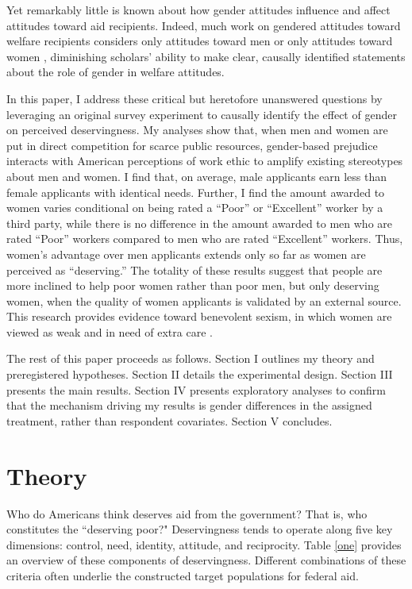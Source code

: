 \documentclass[12pt]{article}%
\begin{document}
\begin{doublespace}
Yet remarkably little is known about how gender attitudes influence and affect attitudes toward aid recipients. Indeed, much work on gendered attitudes toward welfare recipients considers only attitudes toward men \citep{petersen2012deserves, aaroe2014crowding, willrich2000home} or only attitudes toward women \citep{monnat2010color, desante_working_2013, hayes_2020}, diminishing scholars' ability to make clear, causally identified statements about the role of gender in welfare attitudes. 

In this paper, I address these critical but heretofore unanswered questions by leveraging an original survey experiment to causally identify the effect of gender on perceived deservingness. My analyses show that, when men and women are put in direct competition for scarce public resources, gender-based prejudice interacts with American perceptions of work ethic to amplify existing stereotypes about men and women. I find that, on average, male applicants earn less than female applicants with identical needs. Further, I find the amount awarded to women varies conditional on being rated a ``Poor” or ``Excellent” worker by a third party, while there is no difference in the amount awarded to men who are rated ``Poor” workers compared to men who are rated ``Excellent” workers. Thus, women’s advantage over men applicants extends only so far as women are perceived as ``deserving.” The totality of these results suggest that people are more inclined to help poor women rather than poor men, but only deserving women, when the quality of women applicants is validated by an external source. This research provides evidence toward benevolent sexism, in which women are viewed as weak and in need of extra care \citep{glick_hostile_1997, glick_ambivalent_2001}.

The rest of this paper proceeds as follows. Section I outlines my theory and preregistered hypotheses. Section II details the experimental design. Section III presents the main results. Section IV presents exploratory analyses to confirm that the mechanism driving my results is gender differences in the assigned treatment, rather than respondent covariates. Section V concludes.
\\

\section*{Theory}
Who do Americans think deserves aid from the government? That is, who constitutes the ``deserving poor?" Deservingness tends to operate along five key dimensions: control, need, identity, attitude, and reciprocity. Table \ref{one} provides an overview of these components of deservingness. Different combinations of these criteria often underlie the constructed target populations for federal aid. 


\end{doublespace}
\end{document}

